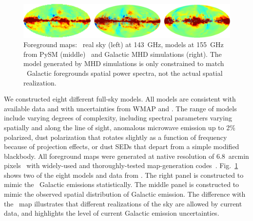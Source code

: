 \documentclass[PICOReport.tex]{subfiles}
\begin{document}
\begin{figure}[t]
\begin{center}
\includegraphics[width=.95\textwidth]{images/foregrounds_maps_planck_models}
\vspace{-0.1in}
\caption{\captiontext
Foreground maps: \planck~real sky (left) at 143~GHz, models at 155~GHz from PySM (middle)~\citep{thorne2018_pysm} and Galactic MHD simulations (right). The model generated by MHD simulations is only constrained to match \planck\ Galactic foregrounds spatial power spectra, not the actual spatial realization. 
\label{fig:pysm_foregrounds} }
\end{center} 
\vspace{-0.2in}
\end{figure}

We constructed eight different full-sky models. All models are consistent with available data and with uncertainties from WMAP and \planck . The range of models include varying degrees of complexity, including spectral parameters varying spatially and along the line of sight, anomalous microwave emission up to 2\% polarized, dust polarization that rotates slightly as a function of frequency because of projection effects, or dust \ac{SED}s that depart from a simple modified blackbody. All foreground maps were generated at native resolution of 6.8~arcmin pixels~\citep{gorski/etal:2005} with widely-used and thoroughly-tested map-generation codes~\citep{thorne2018_pysm,delabrouille/etal:2013}. Fig.~\ref{fig:pysm_foregrounds} shows two of the eight models and data from \planck . The right panel is constructed to mimic the \planck\ Galactic emissions statistically. The middle panel is constructed to mimic the observed spatial distribution of Galactic emission. The difference with the \planck\ map illustrates that different realizations of the sky are allowed by current data, and highlights the level of current Galactic emission uncertainties. 
\end{document}
